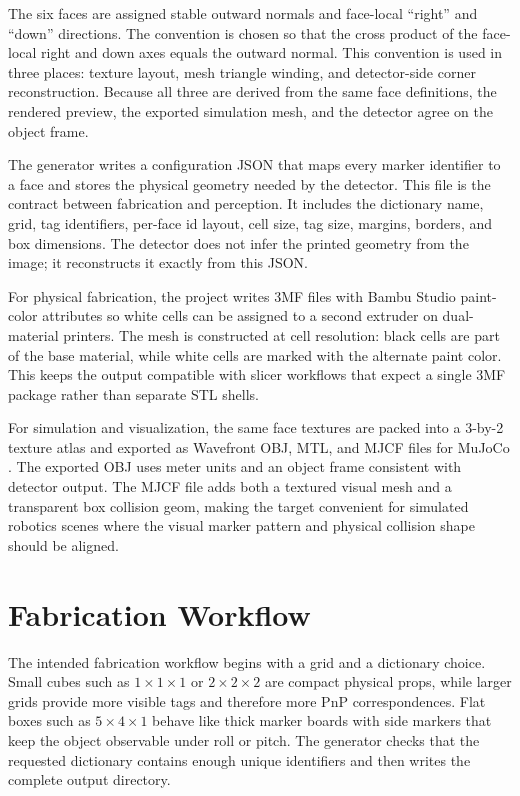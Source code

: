 \documentclass[conference]{IEEEtran}
\begin{document}
The six faces are assigned stable outward normals and face-local ``right'' and ``down'' directions. The convention is chosen so that the cross product of the face-local right and down axes equals the outward normal. This convention is used in three places: texture layout, mesh triangle winding, and detector-side corner reconstruction. Because all three are derived from the same face definitions, the rendered preview, the exported simulation mesh, and the detector agree on the object frame.

The generator writes a configuration JSON that maps every marker identifier to a face and stores the physical geometry needed by the detector. This file is the contract between fabrication and perception. It includes the dictionary name, grid, tag identifiers, per-face id layout, cell size, tag size, margins, borders, and box dimensions. The detector does not infer the printed geometry from the image; it reconstructs it exactly from this JSON.

For physical fabrication, the project writes 3MF files with Bambu Studio paint-color attributes so white cells can be assigned to a second extruder on dual-material printers. The mesh is constructed at cell resolution: black cells are part of the base material, while white cells are marked with the alternate paint color. This keeps the output compatible with slicer workflows that expect a single 3MF package rather than separate STL shells.

For simulation and visualization, the same face textures are packed into a 3-by-2 texture atlas and exported as Wavefront OBJ, MTL, and MJCF files for MuJoCo \cite{mujoco}. The exported OBJ uses meter units and an object frame consistent with detector output. The MJCF file adds both a textured visual mesh and a transparent box collision geom, making the target convenient for simulated robotics scenes where the visual marker pattern and physical collision shape should be aligned.

\section{Fabrication Workflow}
The intended fabrication workflow begins with a grid and a dictionary choice. Small cubes such as \(1\times1\times1\) or \(2\times2\times2\) are compact physical props, while larger grids provide more visible tags and therefore more PnP correspondences. Flat boxes such as \(5\times4\times1\) behave like thick marker boards with side markers that keep the object observable under roll or pitch. The generator checks that the requested dictionary contains enough unique identifiers and then writes the complete output directory.
\end{document}
